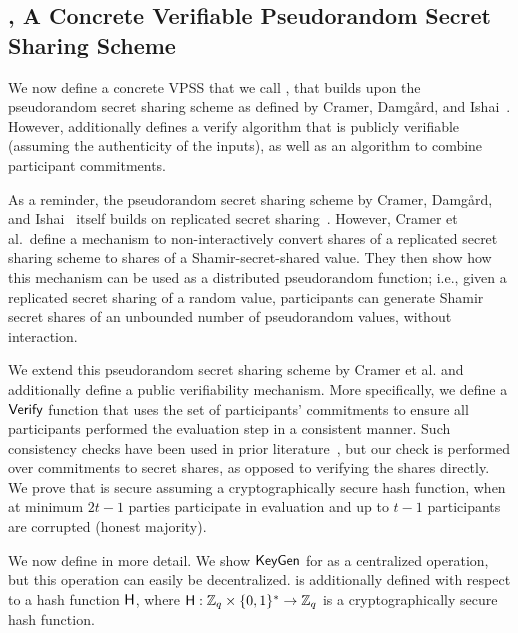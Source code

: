 \subsection{\DVRFOne, A Concrete Verifiable Pseudorandom Secret Sharing Scheme}
\label{dvrf-concrete}

We now define a concrete VPSS that we call \DVRFOne,
that builds upon the pseudorandom secret sharing scheme as defined by Cramer, Damg{\aa}rd, and Ishai~\cite{CramerDI05}.
However, \DVRFOne additionally defines a verify algorithm that is publicly verifiable (assuming the authenticity of the inputs),
as well as an algorithm to combine participant commitments.

As a reminder,
the pseudorandom secret sharing scheme by Cramer, Damg{\aa}rd, and Ishai~\cite{CramerDI05}  itself builds on replicated secret sharing~\cite{MitsuruSN89}.
However, Cramer et al.\ define a mechanism to non-interactively convert shares of a replicated secret sharing scheme to shares of a Shamir-secret-shared value.
They then show how this mechanism can be used as a distributed pseudorandom function;
i.e., given a replicated secret sharing of a random value,
participants can generate Shamir secret shares of an unbounded number of pseudorandom values,
without interaction.

We extend this pseudorandom secret sharing scheme by Cramer et al. and additionally define a public verifiability mechanism.
More specifically,
we define a $\mathsf{Verify}$ function that uses the set of participants' commitments to ensure all participants performed the evaluation step  in a consistent manner.
Such consistency checks have been used in prior literature~\cite{BenhamoudaBGHIN21},
but our check is performed over commitments to secret shares,
as opposed to verifying the shares directly.
%
We prove that \DVRFOne is secure assuming a cryptographically secure hash function,
when at minimum $2t-1$ parties participate in evaluation and up to $t-1$ participants are corrupted (honest majority).

We now define \DVRFOne in more detail. We show $\mathsf{KeyGen}$ for \DVRFOne as a centralized operation,
but this operation can easily be decentralized.
\DVRFOne is additionally defined with respect to a hash function $\mathsf{H}$,
where $\mathsf{H}: \mathbb{Z}_q \times \{ 0, 1\}^* \rightarrow \mathbb{Z}_q$ is a cryptographically secure hash function.

